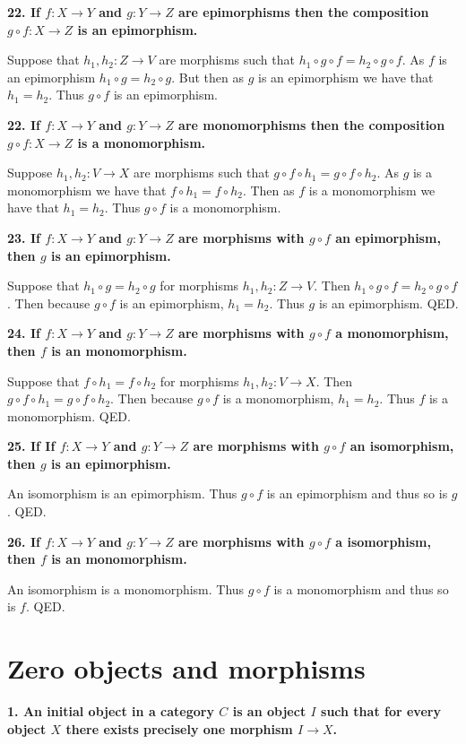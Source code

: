 \documentclass[12pt]{article}
\begin{document}
\textbf{22. If $f : X \to Y$ and $g : Y \to Z$ are epimorphisms then the composition $g\circ f : X \to Z$ is an epimorphism.}

Suppose that $h_1, h_2 : Z \to V$ are morphisms such that $h_1\circ g\circ f = h_2\circ g\circ f$. As $f$ is an epimorphism $h_1\circ g = h_2\circ g$. But then as $g$ is an epimorphism we have that $h_1 = h_2$. Thus $g\circ f$ is an epimorphism.

\textbf{22. If $f : X \to Y$ and $g : Y \to Z$ are monomorphisms then the composition $g\circ f : X \to Z$ is a monomorphism.}

Suppose $h_1, h_2 : V \to X$ are morphisms such that $g\circ f\circ h_1 = g\circ f\circ h_2$. As $g$ is a monomorphism we have that $f\circ h_1 = f\circ h_2$. Then as $f$ is a monomorphism we have that $h_1 = h_2$. Thus $g\circ f$ is a monomorphism.

\textbf{23. If $f : X \to Y$ and $g : Y \to Z$ are morphisms with $g\circ f$ an epimorphism, then $g$ is an epimorphism.}

Suppose that $h_1\circ g = h_2\circ g$ for morphisms $h_1, h_2 : Z \to V$. Then $h_1\circ g\circ f = h_2\circ g\circ f$. Then because $g\circ f$ is an epimorphism, $h_1 = h_2$. Thus $g$ is an epimorphism. QED.

\textbf{24. If $f : X \to Y$ and $g : Y \to Z$ are morphisms with $g\circ f$ a monomorphism, then $f$ is an monomorphism.}

Suppose that $f\circ h_1 = f\circ h_2$ for morphisms $h_1, h_2 : V \to X$. Then $g\circ f\circ h_1 = g\circ f\circ h_2$. Then because $g\circ f$ is a monomorphism, $h_1 = h_2$. Thus $f$ is a monomorphism. QED.

\textbf{25. If If $f : X \to Y$ and $g : Y \to Z$ are morphisms with $g\circ f$ an isomorphism, then $g$ is an epimorphism.}

An isomorphism is an epimorphism. Thus $g\circ f$ is an epimorphism and thus so is $g$. QED.

\textbf{26. If $f : X \to Y$ and $g : Y \to Z$ are morphisms with $g\circ f$ a isomorphism, then $f$ is an monomorphism.}

An isomorphism is a monomorphism. Thus $g\circ f$ is a monomorphism and thus so is $f$. QED.

\section{Zero objects and morphisms}

\textbf{1. An initial object in a category $C$ is an object $I$ such that for every object $X$ there exists precisely one morphism $I \to X$.}
\end{document}
